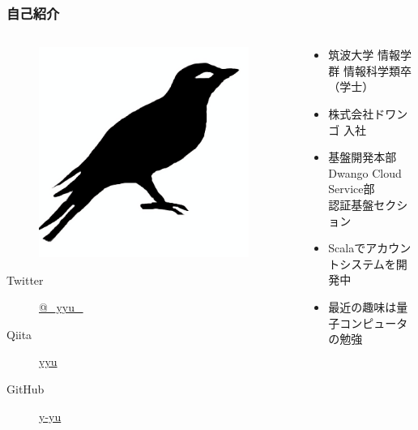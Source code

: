 \begin{frame}
  \frametitle{自己紹介}
  
  \begin{columns}
    \begin{column}{0.3\textwidth}
      \centering
      \begin{figure}
        \includegraphics[width=0.95\textwidth]{img/bird2x.png}
      \end{figure}

      \begin{description}
        \item[Twitter] \href{https://twitter.com/\_yyu\_}{@\_yyu\_}
        \item[Qiita] \href{http://qiita.com/yyu}{yyu}
        \item[GitHub] \href{https://github.com/y-yu}{y-yu}
      \end{description}
    \end{column}
    \begin{column}{0.7\textwidth}
      \begin{itemize}
        \item<2-> 筑波大学 情報学群 情報科学類卒（学士）
        \item<3-> 株式会社ドワンゴ 入社
        \item<4-> 基盤開発本部 Dwango Cloud Service部\\
        認証基盤セクション
        \item<5-> Scalaでアカウントシステムを開発中
        \item<6-> 最近の趣味は量子コンピュータの勉強
      \end{itemize}
    \end{column}
  \end{columns}
\end{frame}

